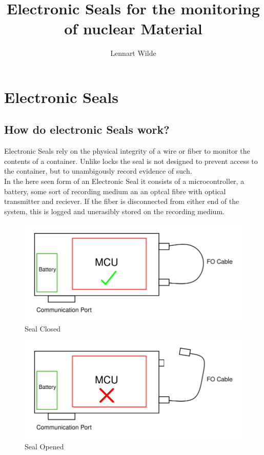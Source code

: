 \documentclass[12pt,twoside,a4paper]{scrartcl}
\author{Lennart Wilde}
\title{Electronic Seals for the monitoring of nuclear Material}
\begin{document}
    \maketitle
    \newpage

    \section{Electronic Seals}
    \subsection{How do electronic Seals work?}
        
        Electronic Seals rely on the physical integrity of a wire or fiber to monitor the contents of a container. 
        Unlike locks the seal is not designed to prevent access to the container, but to unambigously record evidence of such. \\
        
        In the here seen form of an Electronic Seal it consists of a microcontroller, a battery, some sort of recording medium an an optcal fibre with optical transmitter and reciever. 
        If the fiber is disconnected from either end of the system, this is logged and unerasibly stored on the recording medium.
        
        \begin{figure}[h]
            \centering
            \includegraphics[width = 0.25 \textwidth]{"Pictures/Seal_Closed.png"}
            \caption{Seal Closed}
        \end{figure}
        
        \begin{figure}[h]
            \centering
            \includegraphics[width = 0.25 \textwidth]{"Pictures/Seal_Opened.png"}
            \caption{Seal Opened}
        \end{figure}
        
\end{document}
